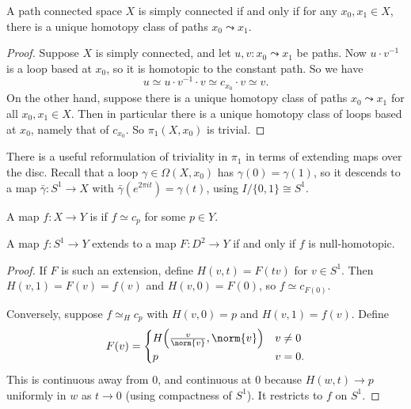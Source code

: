\documentclass[a4paper]{scrartcl}
\begin{document}
\begin{lemma} \label{lem:sc-unique-path}
	A path connected space $X$ is simply connected if and only if for any $x_0, x_1 \in X$, there is a unique homotopy class of paths $x_0 \leadsto x_1$.
\end{lemma}
\begin{proof}
	Suppose $X$ is simply connected, and let $u, v: x_0 \leadsto x_1$ be paths. Now $u \cdot v^{-1}$ is a loop based at $x_0$, so it is homotopic to the constant path. So we have
	$$
	u \simeq u \cdot v^{-1} \cdot v \simeq c_{x_0} \cdot v \simeq v.
	$$
	On the other hand, suppose there is a unique homotopy class of paths $x_0 \leadsto x_1$ for all $x_0, x_1 \in X$. Then in particular there is a unique homotopy class of loops based at $x_0$, namely that of $c_{x_0}$. So $\pi_1(X, x_0)$ is trivial.
\end{proof}

There is a useful reformulation of triviality in $\pi_1$ in terms of extending maps over
the disc. Recall that a loop $\gamma \in \Omega(X, x_0)$ has $\gamma(0) = \gamma(1)$, so
it descends to a map $\bar\gamma: S^1 \to X$ with $\bar{\gamma}(e^{2\pi i t}) = \gamma(t)$,
using $I/\{0,1\} \cong S^1$.

\begin{definition}
	A map $f: X \to Y$ is  if $f \simeq c_p$ for some $p \in Y$.
\end{definition}

\begin{lemma} \label{lem:extend-disc}
	A map $f: S^1 \to Y$ extends to a map $F: D^2 \to Y$ if and only if $f$ is null-homotopic.
\end{lemma}
\begin{proof}
	If $F$ is such an extension, define $H(v, t) = F(tv)$ for $v \in S^1$. Then $H(v,1) = F(v) = f(v)$ and $H(v, 0) = F(0)$, so $f \simeq c_{F(0)}$.

	Conversely, suppose $f \simeq_H c_p$ with $H(v, 0) = p$ and $H(v,1) = f(v)$. Define
	$$
	F(v) = \begin{cases} H\!\left(\frac{v}{\norm{v}}, \norm{v}\right) & v \neq 0 \\ p & v = 0.\end{cases}
	$$
	This is continuous away from $0$, and continuous at $0$ because $H(w, t) \to p$ uniformly in $w$ as $t \to 0$ (using compactness of $S^1$). It restricts to $f$ on $S^1$.
\end{proof}
\end{document}
